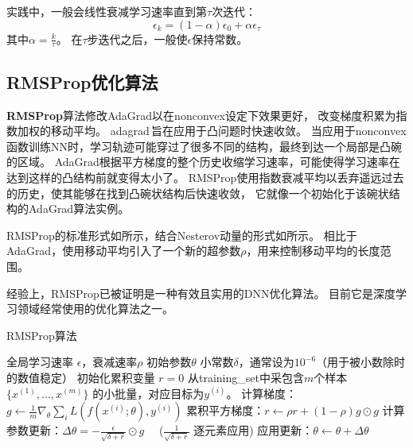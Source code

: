 实践中，一般会线性衰减学习速率直到第$\tau$次迭代：
\begin{equation}
\label{eq:8.14}
\epsilon_k = (1-\alpha) \epsilon_0 + \alpha \epsilon_\tau
\end{equation}
其中$\alpha = \frac{k}{\tau}$。
在$\tau$步迭代之后，一般使$\epsilon$保持常数。

\subsection{RMSProp优化算法}
\label{sec:rmsprop}
\textbf{RMSProp}算法修改AdaGrad以在\gls{nonconvex}设定下效果更好，
改变梯度积累为指数加权的移动平均。
\gls{adagrad}\,旨在应用于凸问题时快速收敛。
当应用于\gls{nonconvex}函数训练\gls{NN}时，学习轨迹可能穿过了很多不同的结构，最终到达一个局部是凸碗的区域。
AdaGrad根据平方梯度的整个历史收缩学习速率，可能使得学习速率在达到这样的凸结构前就变得太小了。
RMSProp使用指数衰减平均以丢弃遥远过去的历史，使其能够在找到凸碗状结构后快速收敛，
它就像一个初始化于该碗状结构的AdaGrad算法实例。

RMSProp的标准形式如所示，结合Nesterov动量的形式如所示。
相比于AdaGrad，使用移动平均引入了一个新的超参数$\rho$，用来控制移动平均的长度范围。

经验上，RMSProp已被证明是一种有效且实用的DNN优化算法。
目前它是深度学习领域经常使用的优化算法之一。\par

\begin{algorithm}[ht]
	\caption{RMSProp算法}
	\label{alg:rms_prop}
	\begin{algorithmic}
		\REQUIRE 全局学习速率 $\epsilon$，衰减速率$\rho$
		\REQUIRE  初始参数$\theta$
		\REQUIRE 小常数$\delta$，通常设为$10^{-6}$（用于被小数除时的数值稳定）
		\STATE 初始化累积变量 $r = 0$
		\STATE 从\gls{training_set}中采包含$m$个样本$\{ x^{(1)},\dots, x^{(m)}\}$ 的小批量，对应目标为$y^{(i)}$。
		\STATE 计算梯度：$g \leftarrow  
		\frac{1}{m} \nabla_{\theta} \sum_i L(f(x^{(i)};\theta),y^{(i)})$ 
		\STATE 累积平方梯度：$r \leftarrow \rho
		r + (1-\rho) g \odot g$
		\STATE 计算参数更新：$\Delta \theta =
		-\frac{\epsilon}{\sqrt{\delta + r}} \odot g$  \ \  ($\frac{1}{\sqrt{\delta + r}}$ 逐元素应用)
		\STATE 应用更新：$\theta \leftarrow \theta + \Delta \theta$
		\ENDWHILE
	\end{algorithmic}
\end{algorithm}
